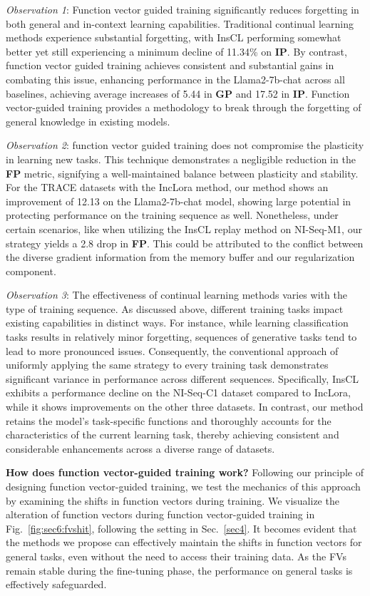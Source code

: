 \textit{Observation 1}: Function vector guided training significantly reduces forgetting in both general and in-context learning capabilities. 
Traditional continual learning methods experience substantial forgetting, with InsCL performing somewhat better yet still experiencing a minimum decline of 11.34\% on \textbf{IP}. By contrast, function vector guided training achieves consistent and substantial gains in combating this issue, enhancing performance in the Llama2-7b-chat across all baselines, achieving average increases of 5.44 in \textbf{GP} and 17.52 in \textbf{IP}. Function vector-guided training provides a methodology to break through the forgetting of general knowledge in existing models.



\textit{Observation 2}: function vector guided training does not compromise the plasticity in learning new tasks. This technique demonstrates a negligible reduction in the \textbf{FP} metric, signifying a well-maintained balance between plasticity and stability. For the TRACE datasets with the IncLora method, our method shows an improvement of 12.13 on the Llama2-7b-chat model, showing large potential in protecting performance on the training sequence as well. Nonetheless, under certain scenarios, like when utilizing the InsCL replay method on NI-Seq-M1, our strategy yields a 2.8 drop in \textbf{FP}. This could be attributed to the conflict between the diverse gradient information from the memory buffer and our regularization component.




\textit{Observation 3}: The effectiveness of continual learning methods varies with the type of training sequence. As discussed above, different training tasks impact existing capabilities in distinct ways. For instance, while learning classification tasks results in relatively minor forgetting, sequences of generative tasks tend to lead to more pronounced issues. Consequently, the conventional approach of uniformly applying the same strategy to every training task demonstrates significant variance in performance across different sequences. Specifically, InsCL exhibits a performance decline on the NI-Seq-C1 dataset compared to IncLora, while it shows improvements on the other three datasets. In contrast, our method retains the model's task-specific functions and thoroughly accounts for the characteristics of the current learning task, thereby achieving consistent and considerable enhancements across a diverse range of datasets.


\textbf{How does function vector-guided training work?} Following our principle of designing function vector-guided training, we test the mechanics of this approach by examining the shifts in function vectors during training. We visualize the alteration of function vectors during function vector-guided training in Fig.~\ref{fig:sec6:fvshit}, following the setting in Sec.~\ref{sec4}. It becomes evident that the methods we propose can effectively maintain the shifts in function vectors for general tasks, even without the need to access their training data. As the FVs remain stable during the fine-tuning phase, the performance on general tasks is effectively safeguarded.
